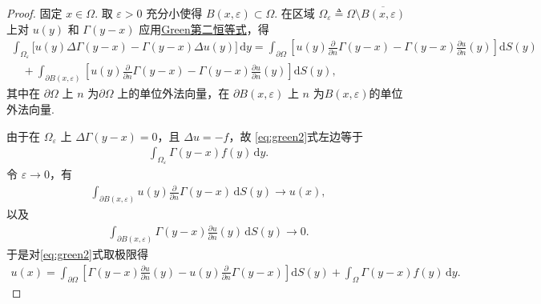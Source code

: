 \documentclass[../../main.tex]{subfiles}%
\begin{document}
\begin{proof}
固定 $x\in\Omega$. 取 $\varepsilon>0$ 充分小使得 $B(x,\varepsilon)\subset\Omega$. 在区域 $\Omega_\varepsilon\triangleq\Omega\setminus \overline{B(x,\varepsilon)}$ 上对 $u(y)$ 和 $\varGamma (y-x)$ 应用\hyperref[Basis of Analytics-theorem:Green第二恒等式]{Green第二恒等式}，得
\begin{align}
\int_{\Omega_\varepsilon} \big[u(y)\Delta\varGamma (y-x)-\varGamma (y-x)\Delta u(y)\big]\,\mathrm{d}y
= \int_{\partial\Omega} \left[u(y)\frac{\partial}{\partial n}\varGamma (y-x)-\varGamma (y-x)\frac{\partial u}{\partial n}(y)\right]\mathrm{d}S(y) \nonumber\\
\quad + \int_{\partial B(x,\varepsilon)} \left[u(y)\frac{\partial}{\partial n}\varGamma (y-x)-\varGamma (y-x)\frac{\partial u}{\partial n}(y)\right]\mathrm{d}S(y), \label{eq:green2}
\end{align}
其中在 $\partial\Omega$ 上 $n$ 为$\partial\Omega$ 上的单位外法向量，在 $\partial B(x,\varepsilon)$ 上 $n$ 为$B(x,\varepsilon)$的单位外法向量.

由于在 $\Omega_\varepsilon$ 上 $\Delta\varGamma (y-x)=0$，且 $\Delta u=-f$，故 \eqref{eq:green2}式左边等于
\begin{align*}
\int_{\Omega_\varepsilon} \varGamma (y-x) f(y)\,\mathrm{d}y.
\end{align*}
令 $\varepsilon\to 0$，有
\begin{align*}
\int_{\partial B(x,\varepsilon)} u(y)\frac{\partial}{\partial n}\varGamma (y-x)\,\mathrm{d}S(y) \longrightarrow u(x),
\end{align*}
以及
\begin{align*}
\int_{\partial B(x,\varepsilon)} \varGamma (y-x)\frac{\partial u}{\partial n}(y)\,\mathrm{d}S(y) \longrightarrow 0. 
\end{align*}
于是对\eqref{eq:green2}式取极限得
\begin{align}
u(x)=\int_{\partial\Omega}\left[\varGamma (y-x)\frac{\partial u}{\partial n}(y)-u(y)\frac{\partial}{\partial n}\varGamma (y-x)\right]\mathrm{d}S(y)+\int_\Omega \varGamma (y-x)f(y)\,\mathrm{d}y. \label{repr}
\end{align}


\end{proof}
\end{document}
